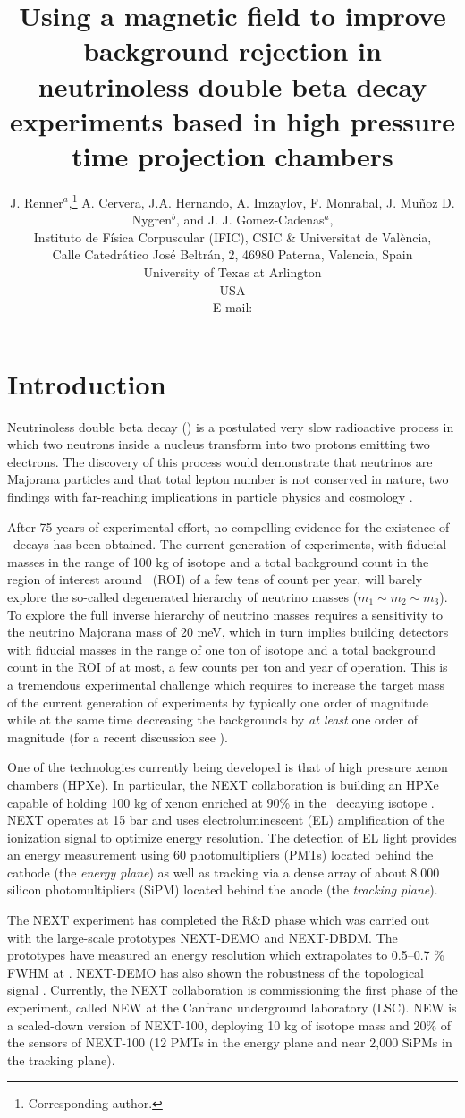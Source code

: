 \documentclass{JINST}
\title{Using a magnetic field to improve background rejection in neutrinoless double beta decay experiments based in high pressure time projection chambers}
\author{J. Renner$^a$,\thanks{Corresponding author.}
A. Cervera, J.A. Hernando, A. Imzaylov, F. Monrabal, J. Mu\~noz D. Nygren$^b$, and J. J. Gomez-Cadenas$^a$,\\
\llap{$^a$}Instituto de F\'isica Corpuscular (IFIC), CSIC \& Universitat de Val\`encia,\\ 
Calle Catedr\'atico Jos\'e Beltr\'an, 2, 46980 Paterna, Valencia, Spain\\
\llap{$^b$}University of Texas at Arlington\\
  USA\\
E-mail: \email{josh.e.renner@gmail.com}}
\begin{document}
\section{Introduction}\label{sec:intro}

Neutrinoless double beta decay (\bbonu) is a postulated very slow radioactive process in which two neutrons inside a nucleus transform into two protons emitting two electrons. The discovery of this process would demonstrate that neutrinos are Majorana particles and that total lepton number is not conserved in nature, two findings with far-reaching implications in particle physics and cosmology \cite{Gomez_2013, GomezCadenas:2013ue, Cadenas_2012}.

After 75 years of experimental effort, no compelling evidence for the existence of \bbonu\ decays has been obtained. The current generation of experiments, with fiducial masses in the range of 100 kg of isotope and a total background count in the region of interest around \Qbb\ (ROI) of a few tens of count per year, will barely explore the so-called degenerated hierarchy of neutrino masses ($m_1 \sim m_2 \sim m_3$). To explore the full inverse hierarchy of neutrino masses requires a sensitivity to the neutrino Majorana mass of 20 meV, which in turn implies building detectors with fiducial masses in the range of one ton of isotope and a total background count in the ROI of at most, a few counts per ton and year of operation. This is a tremendous experimental challenge which requires to increase the target mass of the current generation of experiments by typically one order of magnitude while at the same time decreasing the backgrounds by {\em at least} one order of magnitude (for a recent discussion see \cite{Gomez-Cadenas:2015twa}). 

One of the technologies currently being developed is that of high pressure xenon chambers (HPXe). In particular, the NEXT collaboration \cite{Gomez-Cadenas:2014dxa} is building an HPXe capable of holding 100 kg of xenon enriched at 90\% in the \bb\ decaying isotope \XE. NEXT operates at 15 bar and uses electroluminescent (EL) amplification of the ionization signal to optimize energy resolution. The detection of EL light provides an energy measurement using 60 photomultipliers (PMTs) located behind the cathode (the \emph{energy plane}) as well as tracking  via a dense array of about 8,000 silicon photomultipliers (SiPM) located behind the anode (the \emph{tracking plane}).

 The NEXT experiment has completed the R\&D phase which was carried out with the large-scale prototypes NEXT-DEMO and NEXT-DBDM. The prototypes have measured an energy resolution which extrapolates to 0.5--0.7 \% FWHM at \Qbb. NEXT-DEMO has also shown the robustness of the topological signal \cite{Alvarez:2012xda,Alvarez:2012kua,Alvarez:2013gxa,Lorca:2014sra}. Currently, the NEXT collaboration is commissioning the first phase of the experiment, called NEW at the Canfranc underground laboratory (LSC). NEW is a scaled-down version of NEXT-100, deploying 10 kg of isotope mass and 20\% of the sensors of NEXT-100 (12 PMTs in the energy plane and near 2,000 SiPMs in the tracking plane).
 
\end{document}
